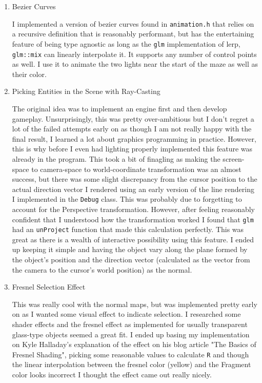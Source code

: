 \documentclass[11pt]{article}
\begin{document}
\begin{enumerate}
\item Bezier Curves
\label{sec:org97f098e}

I implemented a version of bezier curves found in \texttt{animation.h} that relies on a recursive definition that is reasonably performant, but has the entertaining feature of being type agnostic as long as the \texttt{glm} implementation of lerp, \texttt{glm::mix} can linearly interpolate it. It supports any number of control points as well. I use it to animate the two lights near the start of the maze as well as their color.

\item Picking Entities in the Scene with Ray-Casting
\label{sec:orga9a87f8}

The original idea was to implement an engine first and then develop gameplay. Unsurprisingly, this was pretty over-ambitious but I don't regret a lot of the failed attempts early on as though I am not really happy with the final result, I learned a lot about graphics programming in practice. However, this is why before I even had lighting properly implemented this feature was already in the program. This took a bit of finagling as making the screen-space to camera-space to world-coordinate transformation was an almost success, but there was some slight discrepancy from the cursor position to the actual direction vector I rendered using an early version of the line rendering I implemented in the \texttt{Debug} class. This was probably due to forgetting to account for the Perspective transformation. However, after feeling reasonably confident that I understood how the transformation worked I found that \texttt{glm} had an \texttt{unProject} function that made this calculation perfectly. This was great as there is a wealth of interactive possibility using this feature. I ended up keeping it simple and having the object vary along the plane formed by the object's position and the direction vector (calculated as the vector from the camera to the cursor's world position) as the normal.

\item Fresnel Selection Effect
\label{sec:org30129d4}

This was really cool with the normal maps, but was implemented pretty early on as I wanted some visual effect to indicate selection. I researched some shader effects and the fresnel effect as implemented for usually transparent glass-type objects seemed a great fit. I ended up basing my implementation on Kyle Halladay's explanation of the effect on his blog article "The Basics of Fresnel Shading", picking some reasonable values to calculate \texttt{R} and though the linear interpolation between the fresnel color (yellow) and the Fragment color looks incorrect I thought the effect came out really nicely.


\end{enumerate}
\end{document}
